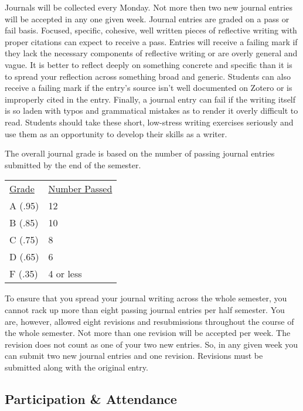 \documentclass[nobib]{tufte-handout}
\begin{document}
Journals will be collected every Monday. Not more then two new journal entries will be accepted in any one given week. Journal entries are graded on a pass or fail basis. Focused, specific, cohesive, well written pieces of reflective writing with proper citations can expect to receive a pass. Entries will receive a failing mark if they lack the necessary components of reflective writing or are overly general and vague. It is better to reflect deeply on something concrete and specific than it is to spread your reflection across something broad and generic. Students can also receive a failing mark if the entry's source isn't well documented on Zotero or is improperly cited in the entry. Finally, a journal entry can fail if the writing itself is so laden with typos and grammatical mistakes as to render it overly difficult to read.  Students should take these short, low-stress writing exercises seriously and use them as an opportunity to develop their skills as a writer.

The overall journal grade is based on the number of passing journal entries submitted by the end of the semester.

\begin{center}
\begin{tabular}{ll}
\underline{Grade} & \underline{Number Passed} \\
A (.95) & 12 \\
B (.85) & 10 \\
C (.75) & 8 \\
D (.65) & 6\\
F (.35) & 4 or less \\
\end{tabular}
\end{center}

To ensure that you spread your journal writing across the whole semester, you cannot rack up more than eight passing journal entries per half semester. You are, however, allowed eight revisions and resubmissions throughout the course of the whole semester. Not more than one revision will be accepted per week. The revision does not count as one of your two new entries. So, in any given week you can submit two new journal entries and one revision. Revisions must be submitted along with the original entry.


\subsection{Participation \& Attendance}
\end{document}
